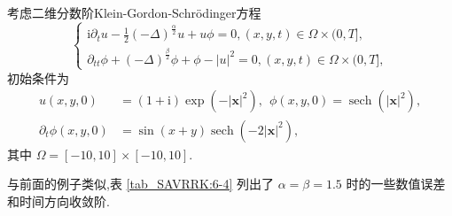 \begin{example}\label{exp_SAVRRK:4}
考虑二维分数阶Klein-Gordon-Schr{\"o}dinger方程\cite{fuStructurepreservingAlgorithmsTwodimensional2020}
\begin{equation}
\begin{cases}
\mathrm{i} \partial_t u-\frac{1}{2}(-\Delta)^{\frac{\alpha}{2}} u+u \phi=0,(x, y, t) \in \Omega \times(0, T],\\
\partial_{t t} \phi+(-\Delta)^{\frac{\beta}{2}} \phi+\phi-|u|^2=0, (x, y, t) \in \Omega \times(0, T],
\end{cases}
\end{equation}
初始条件为
\begin{equation}
	\begin{aligned}
		u(x, y, 0)&=(1+\mathrm{i}) \exp \left(-|\boldsymbol{x}|^2\right),~~\phi(x, y, 0)=\operatorname{sech}\left(|\boldsymbol{x}|^2\right),\\
		\partial_t \phi(x, y, 0)&=\sin (x+y) \operatorname{sech}\left(-2|\boldsymbol{x}|^2\right),
	\end{aligned}
\end{equation}
其中 $\Omega=[-10,10] \times[-10,10]$.
\end{example}

与前面的例子类似,表 \ref{tab_SAVRRK:6-4} 列出了 $\alpha=\beta=1.5$ 时的一些数值误差和时间方向收敛阶.



